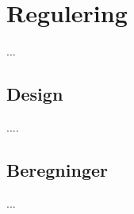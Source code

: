 \section{Regulering}\label{sec:regulering}

...
\subsection{Design}
....
\subsection{Beregninger}
...